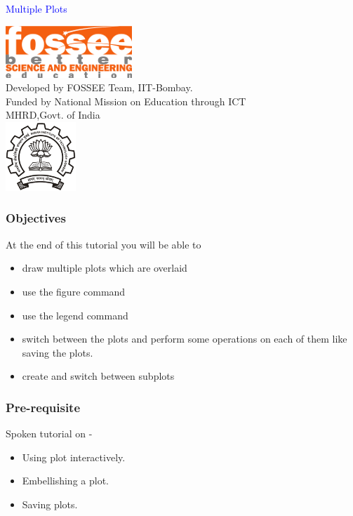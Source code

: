 \documentclass[presentation]{beamer}
\title{}
\author{FOSSEE}
\date{}
\begin{document}
\begin{frame}

\begin{center}
\vspace{12pt}
\textcolor{blue}{\huge Multiple Plots }
\end{center}
\vspace{18pt}
\begin{center}
\vspace{10pt}
\includegraphics[scale=0.95]{../images/fossee-logo.png}\\
\vspace{5pt}
\scriptsize Developed by FOSSEE Team, IIT-Bombay. \\ 
\scriptsize Funded by National Mission on Education through ICT\\
\scriptsize  MHRD,Govt. of India\\
\includegraphics[scale=0.30]{../images/iitb-logo.png}\\
\end{center}
\end{frame}
\begin{frame}
\frametitle{Objectives}
\label{sec-2}

  At the end of this tutorial you will be able to

\begin{itemize}
\item draw multiple plots which are overlaid
\item use the figure command
\item use the legend command
\item switch between the plots and perform some operations on each of them like
    saving the plots.
\item create and switch between subplots
\end{itemize}
\end{frame}
\begin{frame}
\frametitle{Pre-requisite}
\label{sec-3}

  Spoken tutorial on -

\begin{itemize}
\item Using plot interactively.
\item Embellishing a plot.
\item Saving plots.
\end{itemize}
\end{frame}
\end{document}
